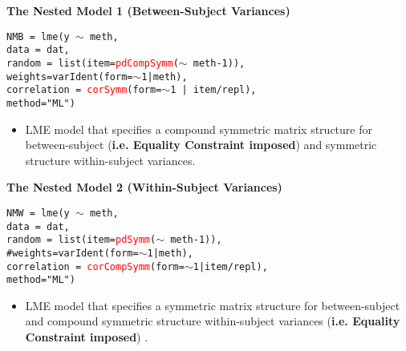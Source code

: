 \documentclass[compress]{beamer}        %
\makeatletter
\newcommand{\tcb}{\textcolor{beamer@blendedblue}}
\newcommand{\tcr}{\textcolor{red}}
\makeatother
\begin{document}
		\begin{frame}[fragile]{\bf \tcb{The Nested Model 1 (Between-Subject Variances)}}
				\vspace{-1cm}
		\begin{framed}	\texttt{NMB = lme(y $\sim$ meth,\\
				\hspace{0.6cm} data = dat,\\
				\hspace{0.6cm} random = list(item=\tcr{pdCompSymm}($\sim$ meth-1)), \\
				\hspace{0.6cm} weights=varIdent(form=$\sim$1|meth),\\
				\hspace{0.6cm} correlation = \tcr{corSymm}(form=$\sim$1 | item/repl),\\
				\hspace{0.6cm} method="ML")}
		\end{framed}	
			\begin{itemize}
				\item LME model that specifies a compound symmetric matrix structure for between-subject (\textbf{i.e. Equality Constraint imposed}) and symmetric structure within-subject variances.
			\end{itemize}
			
		\end{frame}
		\begin{frame}[fragile]{\bf \tcb{The Nested Model 2 (Within-Subject Variances)}}
				\vspace{-1cm}
			\begin{framed}
			\texttt{NMW = lme(y $\sim$ meth,\\
				\hspace{0.35cm} data = dat,\\
				\hspace{0.35cm} random = list(item=\tcr{pdSymm}($\sim$ meth-1)), \\
				\hspace{0.35cm} \tcb{\#weights=varIdent(form=$\sim$1|meth),}\\
				\hspace{0.35cm} correlation = \tcr{corCompSymm}(form=$\sim$1|item/repl),\\
				\hspace{0.35cm} method="ML")}
			\end{framed}
			\begin{itemize}
				\item LME model that specifies a symmetric matrix structure for between-subject and compound symmetric structure within-subject variances (\textbf{i.e. Equality Constraint imposed}) .
			\end{itemize}
		\end{frame}
		
\end{document}
